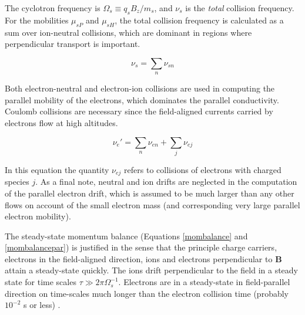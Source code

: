 \documentclass[11pt,letterpaper]{article}
\begin{document}
The cyclotron frequency is $\Omega_s \equiv q_s B_z/m_s$, and $\nu_s$ is the \emph{total} collision frequency.  For the mobilities $\mu_{sP}$ and $\mu_{sH}$, the total collision frequency is calculated as a sum over ion-neutral collisions, which are dominant in regions where perpendicular transport is important.  
\begin{linenomath*} \begin{equation}
\nu_s = \sum_n \nu_{sn} 
\end{equation} \end{linenomath*}
Both electron-neutral and electron-ion collisions are used in computing the parallel mobility of the electrons, which dominates the parallel conductivity.  Coulomb collisions are necessary since the field-aligned currents carried by electrons flow at high altitudes.
\begin{linenomath*} \begin{equation}
\nu_e' = \sum_n \nu_{en} + \sum_j \nu_{ej}
\end{equation} \end{linenomath*}
In this equation the quantity $\nu_{ej}$ refers to collisions of electrons with charged species $j$.  As a final note, neutral and ion drifts are neglected in the computation of the parallel electron drift, which is assumed to be much larger than any other flows on account of the small electron mass (and corresponding very large parallel electron mobility).

The steady-state momentum balance (Equations \ref{mombalance} and \ref{mombalancepar}) is justified in the sense that the principle charge carriers, electrons in the field-aligned direction, ions and electrons perpendicular to $\mathbf{B}$ attain a steady-state quickly.  The ions drift perpendicular to the field in a steady state for time scales $\tau \gg 2 \pi \Omega_s^{-1}$.  Electrons are in a steady-state in field-parallel direction on time-scales much longer than the electron collision time (probably $10^{-2}$ s or less) \citep[e.g.][]{Stmaurice:1996}.  
\end{document}
